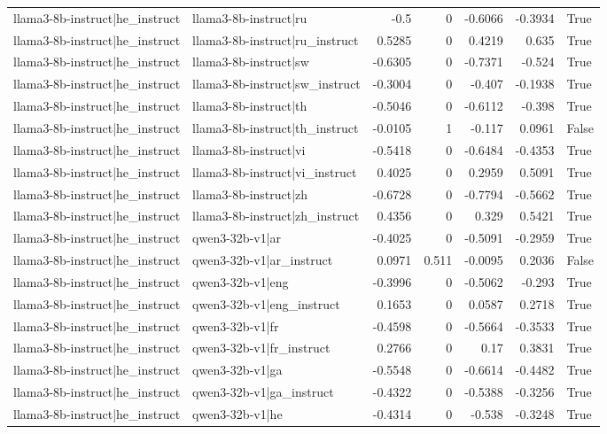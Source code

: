 \begin{table}
\begin{tabular}{l l r r r r l}
llama3-8b-instruct|he_instruct & llama3-8b-instruct|ru & -0.5 & 0 & -0.6066 & -0.3934 & True \\
llama3-8b-instruct|he_instruct & llama3-8b-instruct|ru_instruct & 0.5285 & 0 & 0.4219 & 0.635 & True \\
llama3-8b-instruct|he_instruct & llama3-8b-instruct|sw & -0.6305 & 0 & -0.7371 & -0.524 & True \\
llama3-8b-instruct|he_instruct & llama3-8b-instruct|sw_instruct & -0.3004 & 0 & -0.407 & -0.1938 & True \\
llama3-8b-instruct|he_instruct & llama3-8b-instruct|th & -0.5046 & 0 & -0.6112 & -0.398 & True \\
llama3-8b-instruct|he_instruct & llama3-8b-instruct|th_instruct & -0.0105 & 1 & -0.117 & 0.0961 & False \\
llama3-8b-instruct|he_instruct & llama3-8b-instruct|vi & -0.5418 & 0 & -0.6484 & -0.4353 & True \\
llama3-8b-instruct|he_instruct & llama3-8b-instruct|vi_instruct & 0.4025 & 0 & 0.2959 & 0.5091 & True \\
llama3-8b-instruct|he_instruct & llama3-8b-instruct|zh & -0.6728 & 0 & -0.7794 & -0.5662 & True \\
llama3-8b-instruct|he_instruct & llama3-8b-instruct|zh_instruct & 0.4356 & 0 & 0.329 & 0.5421 & True \\
llama3-8b-instruct|he_instruct & qwen3-32b-v1|ar & -0.4025 & 0 & -0.5091 & -0.2959 & True \\
llama3-8b-instruct|he_instruct & qwen3-32b-v1|ar_instruct & 0.0971 & 0.511 & -0.0095 & 0.2036 & False \\
llama3-8b-instruct|he_instruct & qwen3-32b-v1|eng & -0.3996 & 0 & -0.5062 & -0.293 & True \\
llama3-8b-instruct|he_instruct & qwen3-32b-v1|eng_instruct & 0.1653 & 0 & 0.0587 & 0.2718 & True \\
llama3-8b-instruct|he_instruct & qwen3-32b-v1|fr & -0.4598 & 0 & -0.5664 & -0.3533 & True \\
llama3-8b-instruct|he_instruct & qwen3-32b-v1|fr_instruct & 0.2766 & 0 & 0.17 & 0.3831 & True \\
llama3-8b-instruct|he_instruct & qwen3-32b-v1|ga & -0.5548 & 0 & -0.6614 & -0.4482 & True \\
llama3-8b-instruct|he_instruct & qwen3-32b-v1|ga_instruct & -0.4322 & 0 & -0.5388 & -0.3256 & True \\
llama3-8b-instruct|he_instruct & qwen3-32b-v1|he & -0.4314 & 0 & -0.538 & -0.3248 & True \\

\end{tabular}
\end{table}
